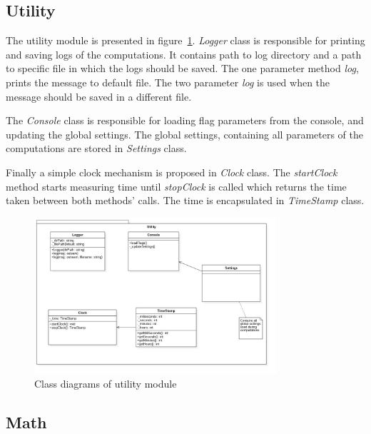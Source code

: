 \documentclass{article}
\begin{document}
\subsection{Utility}

The utility module is presented in figure~\ref{fig:utility_class}. \textit{Logger} class is responsible for printing and saving logs of the computations. It contains path to log directory and a path to specific file in which the logs should be saved. The one parameter method \textit{log}, prints the message to default file. The two parameter \textit{log} is used when the message should be saved in a different file.

The \textit{Console} class is responsible for loading flag parameters from the console, and updating the global settings. The global settings, containing all parameters of the computations are stored in \textit{Settings} class.

Finally a simple clock mechanism is proposed in \textit{Clock} class. The \textit{startClock} method starts measuring time until \textit{stopClock} is called which returns the time taken between both methods' calls. The time is encapsulated in \textit{TimeStamp} class.


%
%
\begin{figure}[H]
	\centering
	\includegraphics[width=0.8\textwidth]{images/utility_class.jpg}
    \caption{Class diagrams of utility module}
    \label{fig:utility_class}
\end{figure}


\newpage
\subsection{Math}
\end{document}

